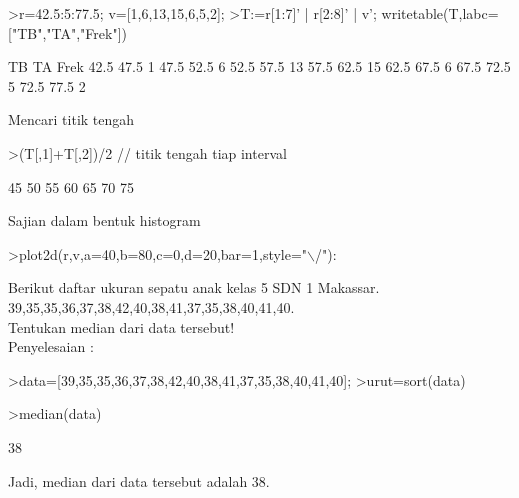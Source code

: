 \documentclass[a4paper,10pt]{article}
\begin{document}
\begin{eulernotebook}
\begin{eulercomment}
\begin{eulercomment}
\begin{eulercomment}
\begin{eulercomment}
\begin{eulercomment}
\begin{eulercomment}
\begin{eulercomment}
\end{eulercomment}
\begin{eulerprompt}
>r=42.5:5:77.5; v=[1,6,13,15,6,5,2];
>T:=r[1:7]' | r[2:8]' | v'; writetable(T,labc=["TB","TA","Frek"])
\end{eulerprompt}
\begin{euleroutput}
          TB        TA      Frek
        42.5      47.5         1
        47.5      52.5         6
        52.5      57.5        13
        57.5      62.5        15
        62.5      67.5         6
        67.5      72.5         5
        72.5      77.5         2
\end{euleroutput}
\begin{eulercomment}
Mencari titik tengah
\end{eulercomment}
\begin{eulerprompt}
>(T[,1]+T[,2])/2 // titik tengah tiap interval
\end{eulerprompt}
\begin{euleroutput}
         45 
         50 
         55 
         60 
         65 
         70 
         75 
\end{euleroutput}
\begin{eulercomment}
Sajian dalam bentuk histogram
\end{eulercomment}
\begin{eulerprompt}
>plot2d(r,v,a=40,b=80,c=0,d=20,bar=1,style="\(\backslash\)/"):
\end{eulerprompt}
\begin{eulercomment}
Berikut daftar ukuran sepatu anak kelas 5 SDN 1 Makassar.\\
39,35,35,36,37,38,42,40,38,41,37,35,38,40,41,40.\\
Tentukan median dari data tersebut!\\
Penyelesaian :
\end{eulercomment}
\begin{eulerprompt}
>data=[39,35,35,36,37,38,42,40,38,41,37,35,38,40,41,40];
>urut=sort(data)
\end{eulerprompt}
\begin{euleroutput}
  [35,  35,  35,  36,  37,  37,  38,  38,  38,  39,  40,  40,  40,  41,
  41,  42]
\end{euleroutput}
\begin{eulerprompt}
>median(data)
\end{eulerprompt}
\begin{euleroutput}
  38
\end{euleroutput}
\begin{eulercomment}
Jadi, median dari data tersebut adalah 38.


\end{eulercomment}
\end{eulercomment}
\end{eulercomment}
\end{eulercomment}
\end{eulercomment}
\end{eulercomment}
\end{eulercomment}
\end{eulernotebook}
\end{document}
